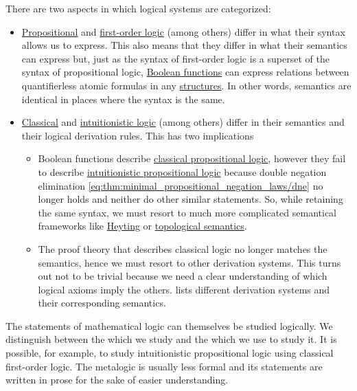 There are two aspects in which logical systems are categorized:
\begin{itemize}
  \item \hyperref[subsec:propositional_logic]{Propositional} and \hyperref[subsec:first_order_logic]{first-order logic} (among others) differ in what their syntax allows us to express. This also means that they differ in what their semantics can express but, just as the syntax of first-order logic is a superset of the syntax of propositional logic, \hyperref[subsec:boolean_functions]{Boolean functions} can express relations between quantifierless atomic formulas in any \hyperref[def:first_order_structure]{structures}. In other words, semantics are identical in places where the syntax is the same.

  \item \hyperref[def:classical_logic]{Classical} and \hyperref[def:intuitionistic_logic]{intuitionistic logic} (among others) differ in their semantics and their logical derivation rules. This has two implications
  \begin{itemize}
     \item Boolean functions describe \hyperref[def:propositional_axiomatic_derivation_system]{classical propositional logic}, however they fail to describe \hyperref[def:intuitionistic_axiomatic_derivation_system]{intuitionistic propositional logic} because double negation elimination \eqref{eq:thm:minimal_propositional_negation_laws/dne} no longer holds and neither do other similar statements. So, while retaining the same syntax, we must resort to much more complicated semantical frameworks like \hyperref[def:propositional_heyting_semantics]{Heyting} or \hyperref[def:propositional_topological_semantics]{topological semantics}.

     \item The proof theory that describes classical logic no longer matches the semantics, hence we must resort to other derivation systems. This turns out not to be trivial because we need a clear understanding of which logical axioms imply the others.  lists different derivation systems and their corresponding semantics.
  \end{itemize}
\end{itemize}

The statements of mathematical logic can themselves be studied logically. We distinguish between the  which we study and the  which we use to study it. It is possible, for example, to study intuitionistic propositional logic using classical first-order logic. The metalogic is usually less formal and its statements are written in prose for the sake of easier understanding.

